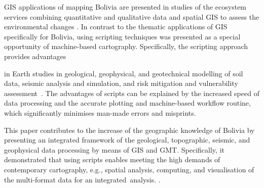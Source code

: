 \documentclass[data,article,accept,pdftex,moreauthors]{Definitions/mdpi}
\begin{document}
 GIS applications {of} mapping Bolivia are presented in studies of {the} ecosystem services combining quantitative and qualitative data and spatial GIS {to} assess {the} environmental changes \cite{Hinojosa}. In contrast to {the} thematic applications of GIS {specifically for} Bolivia, using scripting techniques {was} presented {as a special opportunity} of {machine-based} cartography. Specifically, the scripting approach provides advantages {in Earth studies in geological, geophysical, and geotechnical modelling of soil data, seismic analysis and simulation, and risk mitigation and vulnerability \mbox{assessment~\cite{Falcone,Lindh2021b,Chang,Fayjaloun,Petersen}}. {The advantages of scripts can be explained by} the increased speed of {data processing} and the accurate {plotting} and machine-based {workflow} routine, which {significantly} minimises man-made errors and misprints. 

This paper contributes to the {increase} of {the} geographic knowledge of Bolivia by {presenting} an integrated framework {of} the geological, topographic, seismic, and geophysical data {processing} by means of GIS and GMT{. }Specifically, it demonstrated that using scripts enables meeting {the} high demands of contemporary cartography, e.g.{,} spatial {analysis, computing, and} visualisation of {the} multi-format data for an \mbox{integrated analysis}. .

\vspace{6pt} 


}
\end{document}
